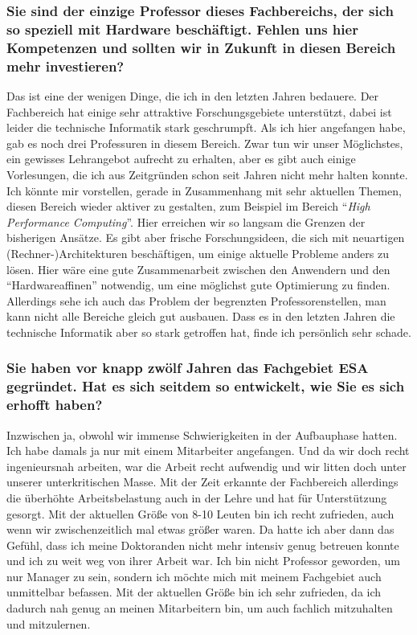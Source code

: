 {\subsubsection{Sie sind der einzige Professor dieses Fachbereichs, der sich so speziell mit Hardware beschäftigt. Fehlen uns hier Kompetenzen und sollten wir in Zukunft in diesen Bereich mehr investieren?}
Das ist eine der wenigen Dinge, die ich in den letzten Jahren bedauere. Der Fachbereich hat einige sehr attraktive Forschungsgebiete unterstützt, dabei ist leider die technische Informatik stark geschrumpft. Als ich hier angefangen habe, gab es noch drei Professuren in diesem Bereich. Zwar tun wir unser Möglichstes, ein gewisses Lehrangebot aufrecht zu erhalten, aber es gibt auch einige Vorlesungen, die ich aus Zeitgründen schon seit Jahren nicht mehr halten konnte. Ich könnte mir vorstellen, gerade in Zusammenhang mit sehr aktuellen Themen, diesen Bereich wieder aktiver zu gestalten, zum Beispiel im Bereich "`\textit{High Performance Computing}"'. Hier erreichen wir so langsam die Grenzen der bisherigen Ansätze. Es gibt aber frische Forschungsideen, die sich mit neuartigen (Rechner-)Architekturen beschäftigen, um einige aktuelle Probleme anders zu lösen. Hier wäre eine gute Zusammenarbeit zwischen den Anwendern und den "`Hardwareaffinen"' notwendig, um eine möglichst gute Optimierung zu finden. Allerdings sehe ich auch das Problem der begrenzten Professorenstellen, man kann nicht alle Bereiche gleich gut ausbauen. Dass es in den letzten Jahren die technische Informatik aber so stark getroffen hat, finde ich persönlich sehr schade. 

\subsubsection{Sie haben vor knapp zwölf Jahren das Fachgebiet ESA gegründet. Hat es sich seitdem so entwickelt, wie Sie es sich erhofft haben?} 
Inzwischen ja, obwohl wir immense Schwierigkeiten in der Aufbauphase hatten. Ich habe damals ja nur mit einem Mitarbeiter angefangen. Und da wir doch recht ingenieursnah arbeiten, war die Arbeit recht aufwendig und wir litten doch unter unserer unterkritischen Masse. Mit der Zeit erkannte der Fachbereich allerdings die überhöhte Arbeitsbelastung auch in der Lehre und hat für Unterstützung gesorgt. Mit der aktuellen Größe von 8-10 Leuten bin ich recht zufrieden, auch wenn wir zwischenzeitlich mal etwas größer waren. Da hatte ich aber dann das Gefühl, dass ich meine Doktoranden nicht mehr intensiv genug betreuen konnte und ich zu weit weg von ihrer Arbeit war. Ich bin nicht Professor geworden, um nur Manager zu sein, sondern ich möchte mich mit meinem Fachgebiet auch unmittelbar befassen. Mit der aktuellen Größe bin ich sehr zufrieden, da ich dadurch nah genug an meinen Mitarbeitern bin, um auch fachlich mitzuhalten und mitzulernen.

}

